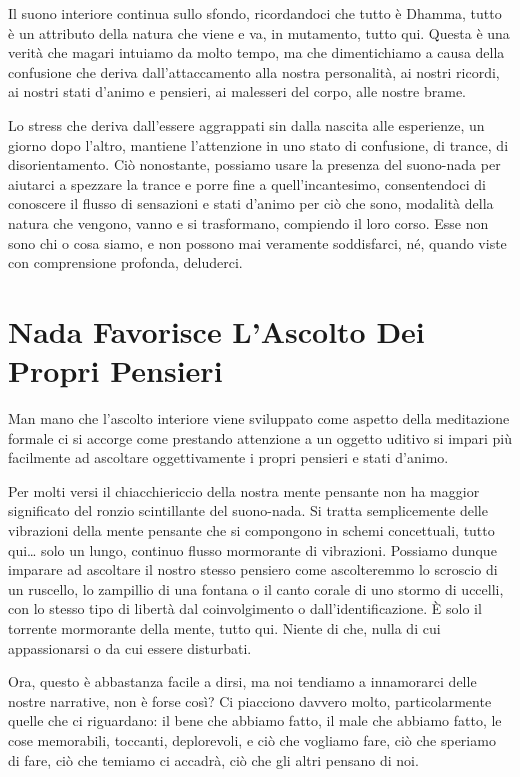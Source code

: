 Il suono interiore continua sullo sfondo, ricordandoci che tutto è
Dhamma, tutto è un attributo della natura che viene e va, in mutamento,
tutto qui. Questa è una verità che magari intuiamo da molto tempo, ma
che dimentichiamo a causa della confusione che deriva dall'attaccamento
alla nostra personalità, ai nostri ricordi, ai nostri stati d'animo e
pensieri, ai malesseri del corpo, alle nostre brame.

Lo stress che deriva dall'essere aggrappati sin dalla nascita alle
esperienze, un giorno dopo l'altro, mantiene l'attenzione in uno stato
di confusione, di trance, di disorientamento. Ciò nonostante, possiamo
usare la presenza del suono-nada per aiutarci a spezzare la trance e
porre fine a quell'incantesimo, consentendoci di conoscere il flusso di
sensazioni e stati d'animo per ciò che sono, modalità della natura che
vengono, vanno e si trasformano, compiendo il loro corso. Esse non sono
chi o cosa siamo, e non possono mai veramente soddisfarci, né, quando
viste con comprensione profonda, deluderci.

\section{Nada Favorisce L'Ascolto Dei Propri Pensieri}

Man mano che l'ascolto interiore viene sviluppato come aspetto della
meditazione formale ci si accorge come prestando attenzione a un oggetto
uditivo si impari più facilmente ad ascoltare oggettivamente i propri
pensieri e stati d'animo.

Per molti versi il chiacchiericcio della nostra mente pensante non ha
maggior significato del ronzio scintillante del suono-nada. Si tratta
semplicemente delle vibrazioni della mente pensante che si compongono in
schemi concettuali, tutto qui\ldots{} solo un lungo, continuo flusso
mormorante di vibrazioni. Possiamo dunque imparare ad ascoltare il
nostro stesso pensiero come ascolteremmo lo scroscio di un ruscello, lo
zampillio di una fontana o il canto corale di uno stormo di uccelli, con
lo stesso tipo di libertà dal coinvolgimento o dall'identificazione. È
solo il torrente mormorante della mente, tutto qui. Niente di che, nulla
di cui appassionarsi o da cui essere disturbati.

Ora, questo è abbastanza facile a dirsi, ma noi tendiamo a innamorarci
delle nostre narrative, non è forse così? Ci piacciono davvero molto,
particolarmente quelle che ci riguardano: il bene che abbiamo fatto, il
male che abbiamo fatto, le cose memorabili, toccanti, deplorevoli, e ciò
che vogliamo fare, ciò che speriamo di fare, ciò che temiamo ci accadrà,
ciò che gli altri pensano di noi.

